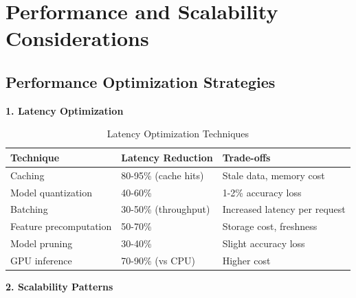 \section{Performance and Scalability Considerations}

\subsection{Performance Optimization Strategies}

\textbf{1. Latency Optimization}

\begin{table}[h]
\centering
\caption{Latency Optimization Techniques}
\begin{tabular}{p{3.5cm}p{4cm}p{4cm}}
\toprule
\textbf{Technique} & \textbf{Latency Reduction} & \textbf{Trade-offs} \\
\midrule
Caching & 80-95\% (cache hits) & Stale data, memory cost \\
\midrule
Model quantization & 40-60\% & 1-2\% accuracy loss \\
\midrule
Batching & 30-50\% (throughput) & Increased latency per request \\
\midrule
Feature precomputation & 50-70\% & Storage cost, freshness \\
\midrule
Model pruning & 30-40\% & Slight accuracy loss \\
\midrule
GPU inference & 70-90\% (vs CPU) & Higher cost \\
\bottomrule
\end{tabular}
\end{table}

\textbf{2. Scalability Patterns}

